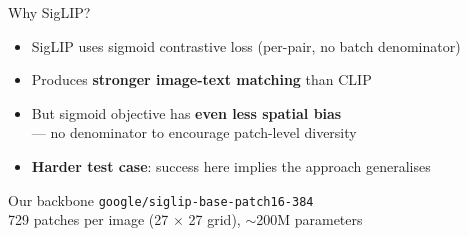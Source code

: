 \documentclass[aspectratio=169,12pt]{beamer}
\begin{document}
\begin{frame}{Why SigLIP?}
  \begin{itemize}
    \item SigLIP uses \alert{sigmoid contrastive loss} (per-pair, no batch denominator)
    \item Produces \textbf{stronger image-text matching} than CLIP
    \item But sigmoid objective has \textbf{even less spatial bias}\\
          \quad — no denominator to encourage patch-level diversity
    \item[$\Rightarrow$] \textbf{Harder test case}: success here implies the approach generalises
  \end{itemize}

  \vspace{1em}
  \begin{block}{Our backbone}
    \texttt{google/siglip-base-patch16-384}\\
    \small 729 patches per image (27 $\times$ 27 grid), $\sim$200M parameters
  \end{block}
\end{frame}
\end{document}

